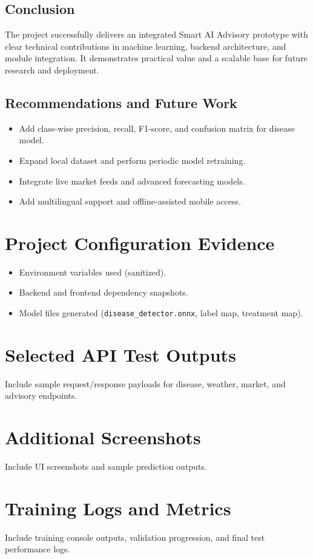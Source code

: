 \documentclass[12pt,a4paper]{report}
\begin{document}
\section{Conclusion}
The project successfully delivers an integrated Smart AI Advisory prototype with clear technical contributions in machine learning, backend architecture, and module integration. It demonstrates practical value and a scalable base for future research and deployment.

\section{Recommendations and Future Work}
\begin{itemize}[noitemsep]
    \item Add class-wise precision, recall, F1-score, and confusion matrix for disease model.
    \item Expand local dataset and perform periodic model retraining.
    \item Integrate live market feeds and advanced forecasting models.
    \item Add multilingual support and offline-assisted mobile access.
\end{itemize}




\appendix

\chapter{Project Configuration Evidence}
\begin{itemize}
    \item Environment variables used (sanitized).
    \item Backend and frontend dependency snapshots.
    \item Model files generated (\texttt{disease\_detector.onnx}, label map, treatment map).
\end{itemize}

\chapter{Selected API Test Outputs}
Include sample request/response payloads for disease, weather, market, and advisory endpoints.

\chapter{Additional Screenshots}
Include UI screenshots and sample prediction outputs.

\chapter{Training Logs and Metrics}
Include training console outputs, validation progression, and final test performance logs.
\end{document}
